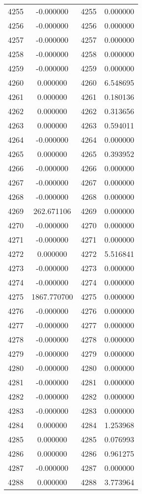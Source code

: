 \documentclass[12pt]{article}
\begin{document}
\begin{longtable}{@{}cccc@{}}
4255 & -0.000000 & 4255 & 0.000000 \\
4256 & -0.000000 & 4256 & 0.000000 \\
4257 & -0.000000 & 4257 & 0.000000 \\
4258 & -0.000000 & 4258 & 0.000000 \\
4259 & -0.000000 & 4259 & 0.000000 \\
4260 & 0.000000 & 4260 & 6.548695 \\
4261 & 0.000000 & 4261 & 0.180136 \\
4262 & 0.000000 & 4262 & 0.313656 \\
4263 & 0.000000 & 4263 & 0.594011 \\
4264 & -0.000000 & 4264 & 0.000000 \\
4265 & 0.000000 & 4265 & 0.393952 \\
4266 & -0.000000 & 4266 & 0.000000 \\
4267 & -0.000000 & 4267 & 0.000000 \\
4268 & -0.000000 & 4268 & 0.000000 \\
4269 & 262.671106 & 4269 & 0.000000 \\
4270 & -0.000000 & 4270 & 0.000000 \\
4271 & -0.000000 & 4271 & 0.000000 \\
4272 & 0.000000 & 4272 & 5.516841 \\
4273 & -0.000000 & 4273 & 0.000000 \\
4274 & -0.000000 & 4274 & 0.000000 \\
4275 & 1867.770700 & 4275 & 0.000000 \\
4276 & -0.000000 & 4276 & 0.000000 \\
4277 & -0.000000 & 4277 & 0.000000 \\
4278 & -0.000000 & 4278 & 0.000000 \\
4279 & -0.000000 & 4279 & 0.000000 \\
4280 & -0.000000 & 4280 & 0.000000 \\
4281 & -0.000000 & 4281 & 0.000000 \\
4282 & -0.000000 & 4282 & 0.000000 \\
4283 & -0.000000 & 4283 & 0.000000 \\
4284 & 0.000000 & 4284 & 1.253968 \\
4285 & 0.000000 & 4285 & 0.076993 \\
4286 & 0.000000 & 4286 & 0.961275 \\
4287 & -0.000000 & 4287 & 0.000000 \\
4288 & 0.000000 & 4288 & 3.773964 \\

\end{longtable}
\end{document}
